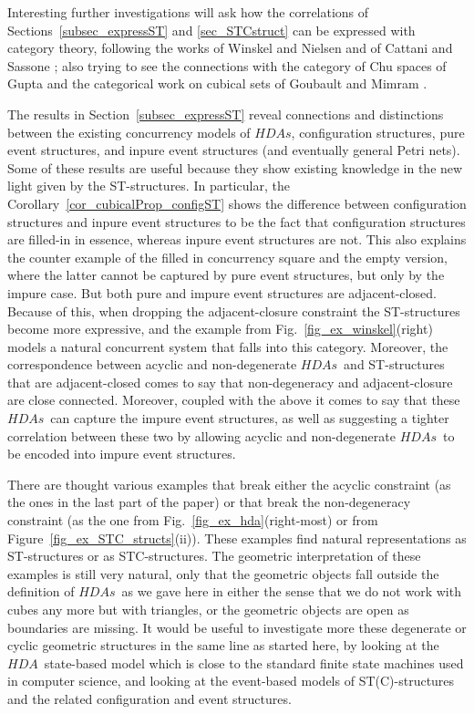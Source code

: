 \documentclass[submission,copyright,creativecommons]{eptcs}
\newcounter{case}
\newcommand\HDA{\ensuremath{\mathit{HDA}}}
\newcommand\HDAs{\ensuremath{\mathit{HDAs}}}
\begin{document}
Interesting further investigations will ask how the correlations of Sections~\ref{subsec_expressST} and \ref{sec_STCstruct} can be expressed with category theory, following the works of Winskel and Nielsen \cite{winskel95modelsCategory} and of Cattani and Sassone \cite{CattaniSassone96HDTS}; also trying to see the connections with the category of Chu spaces of Gupta \cite{gupta94phd_chu} and the categorical work on cubical sets of Goubault and Mimram \cite{Goubault12Category_Cubical}.

The results in Section~\ref{subsec_expressST} reveal connections and distinctions between the existing concurrency models of \HDAs, configuration structures, pure event structures, and inpure event structures (and eventually general Petri nets). Some of these results are useful because they show existing knowledge in the new light given by the ST-structures.
In particular, the Corollary~\ref{cor_cubicalProp_configST} shows the difference between configuration structures and inpure event structures to be the fact that configuration structures are filled-in in essence, whereas inpure event structures are not. This also explains the counter example of the filled in concurrency square and the empty version, where the latter cannot be captured by pure event structures, but only by the impure case.
But both pure and impure event structures are adjacent-closed. Because of this, when dropping the adjacent-closure constraint the ST-structures become more expressive, and the example from Fig.~\ref{fig_ex_winskel}(right) models a natural concurrent system that falls into this category.
Moreover, the correspondence between acyclic and non-degenerate \HDAs\ and ST-structures that are adjacent-closed comes to say that non-degeneracy and adjacent-closure are close connected. Moreover, coupled with the above it comes to say that these \HDAs\ can capture the impure event structures, as well as suggesting a tighter correlation between these two by allowing acyclic and non-degenerate \HDAs\ to be encoded into impure event structures.

There are thought various examples that break either the acyclic constraint (as the ones in the last part of the paper) or that break the non-degeneracy constraint (as the one from Fig.~\ref{fig_ex_hda}(right-most) or from Figure~\ref{fig_ex_STC_structs}(ii)). These examples find natural representations as ST-structures or as STC-structures. The geometric interpretation of these examples is still very natural, only that the geometric objects fall outside the definition of \HDAs\ as we gave here in either the sense that we do not work with cubes any more but with triangles, or the geometric objects are open as boundaries are missing. It would be useful to investigate more these degenerate or cyclic geometric structures in the same line as started here, by looking at the \HDA\ state-based model which is close to the standard finite state machines used in computer science, and looking at the event-based models of ST(C)-structures and the related configuration and event structures.
\end{document}
